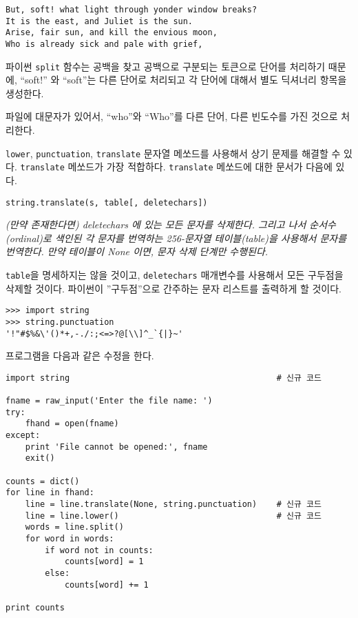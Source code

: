 \beforeverb
\begin{verbatim}
But, soft! what light through yonder window breaks?
It is the east, and Juliet is the sun.
Arise, fair sun, and kill the envious moon,
Who is already sick and pale with grief,
\end{verbatim}
\afterverb
%

파이썬 {\tt split} 함수는 공백을 찾고 공백으로 구분되는 토큰으로 단어를 처리하기 때문에, 
``soft!'' 와 ``soft''는 다른 단어로 처리되고 각 단어에 대해서 별도 딕셔너리 항목을 생성한다.

파일에 대문자가 있어서, ``who''와 ``Who''를 다른 단어, 다른 빈도수를 가진 것으로 처리한다.

{\tt lower}, {\tt punctuation}, {\tt translate} 문자열 메쏘드를 사용해서 상기 문제를 해결할 수 있다.
{\tt translate} 메쏘드가 가장 적합하다. 
{\tt translate} 메쏘드에 대한 문서가 다음에 있다.

\verb"string.translate(s, table[, deletechars])"

\emph{(만약 존재한다면) deletechars 에 있는 모든 문자를 삭제한다.
그리고 나서 순서수(ordinal)로 색인된 각 문자를 번역하는 256-문자열 테이블(table)을 사용해서 문자를 번역한다.
만약 테이블이 None 이면, 문자 삭제 단계만 수행된다. }

{\tt table}을 명세하지는 않을 것이고, {\tt deletechars} 매개변수를 사용해서 모든 구두점을 삭제할 것이다.
파이썬이 ''구두점''으로 간주하는 문자 리스트를 출력하게 할 것이다.

\beforeverb
\begin{verbatim}
>>> import string
>>> string.punctuation
'!"#$%&\'()*+,-./:;<=>?@[\\]^_`{|}~'
\end{verbatim}
\afterverb
%

프로그램을 다음과 같은 수정을 한다.

\beforeverb
\begin{verbatim}
import string                                          # 신규 코드

fname = raw_input('Enter the file name: ')
try:
    fhand = open(fname)
except:
    print 'File cannot be opened:', fname
    exit()

counts = dict()
for line in fhand:
    line = line.translate(None, string.punctuation)    # 신규 코드
    line = line.lower()                                # 신규 코드
    words = line.split()
    for word in words:
        if word not in counts:
            counts[word] = 1
        else:
            counts[word] += 1

print counts
\end{verbatim}
\afterverb
%

